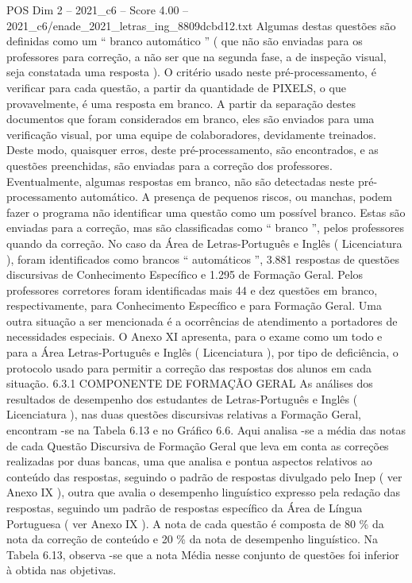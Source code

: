 \begin{textsample}{POS Dim 2 – 2021\_c6 – Score 4.00 – 2021\_c6/enade\_2021\_letras\_ing\_8809dcbd12.txt}
Algumas destas questões são definidas como um “ branco automático ” ( que não são enviadas para os professores para correção, a não ser que na segunda fase, a de inspeção visual, seja constatada uma resposta ).
O critério usado neste pré-processamento, é verificar para cada questão, a partir da quantidade de PIXELS, o que provavelmente, é uma resposta em branco.
A partir da separação destes documentos que foram considerados em branco, eles são enviados para uma verificação visual, por uma equipe de colaboradores, devidamente treinados.
Deste modo, quaisquer erros, deste pré-processamento, são encontrados, e as questões preenchidas, são enviadas para a correção dos professores.
Eventualmente, algumas respostas em branco, não são detectadas neste pré-processamento automático.
A presença de pequenos riscos, ou manchas, podem fazer o programa não identificar uma questão como um possível branco.
Estas são enviadas para a correção, mas são classificadas como “ branco ”, pelos professores quando da correção.
No caso da Área de Letras-Português e Inglês ( Licenciatura ), foram identificados como brancos “ automáticos ”, 3.881 respostas de questões discursivas de Conhecimento Específico e 1.295 de Formação Geral.
Pelos professores corretores foram identificadas mais 44 e dez questões em branco, respectivamente, para Conhecimento Específico e para Formação Geral.
Uma outra situação a ser mencionada é a ocorrências de atendimento a portadores de necessidades especiais.
O Anexo XI apresenta, para o exame como um todo e para a Área Letras-Português e Inglês ( Licenciatura ), por tipo de deficiência, o protocolo usado para permitir a correção das respostas dos alunos em cada situação. 6.3.1 COMPONENTE DE FORMAÇÃO GERAL As análises dos resultados de desempenho dos estudantes de Letras-Português e Inglês ( Licenciatura ), nas duas questões discursivas relativas a Formação Geral, encontram -se na Tabela 6.13 e no Gráfico 6.6.
Aqui analisa -se a média das notas de cada Questão Discursiva de Formação Geral que leva em conta as correções realizadas por duas bancas, uma que analisa e pontua aspectos relativos ao conteúdo das respostas, seguindo o padrão de respostas divulgado pelo Inep ( ver Anexo IX ), outra que avalia o desempenho linguístico expresso pela redação das respostas, seguindo um padrão de respostas específico da Área de Língua Portuguesa ( ver Anexo IX ).
A nota de cada questão é composta de 80 \% da nota da correção de conteúdo e 20 \% da nota de desempenho linguístico.
Na Tabela 6.13, observa -se que a nota Média nesse conjunto de questões foi inferior à obtida nas objetivas.

\end{textsample}
